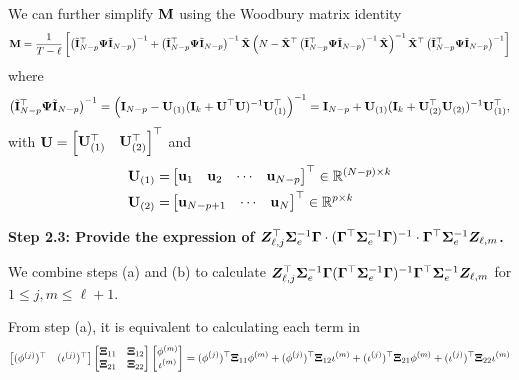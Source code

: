 		We can further simplify $\mathbf{M}$ using the Woodbury matrix identity
		\begin{align*}
		    \mathbf{M} = \frac{1}{T - \ell} \left[ \left( \tilde{\mathbf{I}}_{N-p}^\top \bm{\Psi} \tilde{\mathbf{I}}_{N-p} \right)^{-1} + \left( \tilde{\mathbf{I}}_{N-p}^\top \bm{\Psi} \tilde{\mathbf{I}}_{N-p} \right)^{-1} \tilde{\mathbf{X}} \left( N - \tilde{\mathbf{X}}^\top \left( \tilde{\mathbf{I}}_{N-p}^\top \bm{\Psi} \tilde{\mathbf{I}}_{N-p} \right)^{-1}  \tilde{\mathbf{X}} \right)^{-1} \tilde{\mathbf{X}}^\top \left( \tilde{\mathbf{I}}_{N-p}^\top \bm{\Psi} \tilde{\mathbf{I}}_{N-p} \right)^{-1}   \right] 
		\end{align*}
		where 
		\begin{align*}
		    \left( \tilde{\mathbf{I}}_{N-p}^\top \bm{\Psi} \tilde{\mathbf{I}}_{N-p} \right)^{-1} = \left( \mathbf{I}_{N-p} - \mathbf{U}_{(1)} (\mathbf{I}_k + \mathbf{U}^\top \mathbf{U})^{-1} \mathbf{U}_{(1)}^\top \right)^{-1} = \mathbf{I}_{N-p} + \mathbf{U}_{(1)} (\mathbf{I}_k + \mathbf{U}_{(2)}^\top \mathbf{U}_{(2)})^{-1} \mathbf{U}_{(1)}^\top,
		\end{align*}
  with $\mathbf{U} = \begin{bmatrix}
		\mathbf{U}_{(1)}^\top & \mathbf{U}_{(2)}^\top  
		\end{bmatrix}^\top$ and 
  \begin{align*}
      \mathbf{U}_{(1)} =& \begin{bmatrix}
		\mathbf{u}_1 & \mathbf{u}_2 & \cdots & \mathbf{u}_{N-p}
		\end{bmatrix}^\top \in \mathbb{R}^{(N-p) \times k} \\
  \mathbf{U}_{(2)} =& \begin{bmatrix}
		\mathbf{u}_{N-p+1}  & \cdots & \mathbf{u}_{N}
		\end{bmatrix}^\top \in \mathbb{R}^{p \times k}
  \end{align*}

    \textbf{Step 2.3: Provide the expression of $\bm{Z}_{\ell,j}^\top  \bm{\Sigma}^{-1}_e  \bm{\Gamma} \cdot (\bm{\Gamma}^\top \bm{\Sigma}^{-1}_e  \bm{\Gamma})^{-1} \cdot \bm{\Gamma}^\top \bm{\Sigma}^{-1}_e  \bm{Z}_{\ell,m}$. }
    
  We combine steps (a) and (b) to calculate $\bm{Z}_{\ell,j}^\top \bm{\Sigma}_e^{-1} \bm{\Gamma} (\bm{\Gamma}^\top \bm{\Sigma}_e^{-1} \bm{\Gamma} )^{-1} \bm{\Gamma}^\top \bm{\Sigma}_e^{-1}  \bm{Z}_{\ell,m}$ for $1\leq j, m \leq \ell+1$.
		
		From step (a), it is equivalent to calculating each term in
		\[\begin{bmatrix}
		(\phi^{(j)})^\top & (\iota^{(j)})^\top
		\end{bmatrix}  \begin{bmatrix} \bm{\Xi}_{11} & \bm{\Xi}_{12} \\ \bm{\Xi}_{21} & \bm{\Xi}_{22} \end{bmatrix} \begin{bmatrix}
		\phi^{(m)} \\ \iota^{(m)}
		\end{bmatrix} = (\phi^{(j)})^\top \bm{\Xi}_{11} \phi^{(m)} + (\phi^{(j)})^\top \bm{\Xi}_{12} \iota^{(m)} +  (\iota^{(j)})^\top \bm{\Xi}_{21} \phi^{(m)} +  (\iota^{(j)})^\top \bm{\Xi}_{22} \iota^{(m)} \]
		
